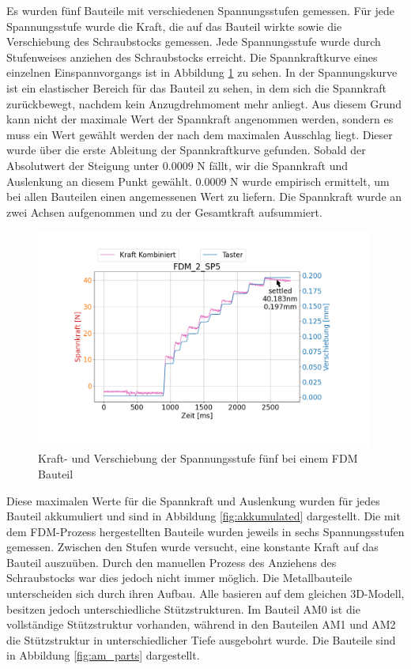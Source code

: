 Es wurden fünf Bauteile mit verschiedenen Spannungsstufen gemessen. Für jede 
Spannungsstufe wurde die Kraft, die auf das Bauteil wirkte sowie die Verschiebung 
des Schraubstocks gemessen.
Jede Spannungsstufe wurde durch Stufenweises anziehen des Schraubstocks erreicht.
Die Spannkraftkurve eines einzelnen Einspannvorgangs ist in 
Abbildung \ref{fig:single} zu sehen. 
In der Spannungskurve ist ein elastischer Bereich für das 
Bauteil zu sehen, in dem sich die Spannkraft zurückbewegt, nachdem kein 
Anzugdrehmoment mehr anliegt. Aus diesem Grund kann nicht der maximale Wert der Spannkraft angenommen werden, 
sondern es muss ein Wert gewählt werden der nach dem maximalen Ausschlag liegt.
Dieser wurde über die erste Ableitung der Spannkraftkurve gefunden. Sobald der 
Absolutwert der Steigung unter 0.0009 N fällt, wir die Spannkraft und Auslenkung an 
diesem Punkt gewählt. 0.0009 N wurde empirisch ermittelt, um bei allen Bauteilen einen 
angemessenen Wert zu liefern.
Die Spannkraft wurde an zwei Achsen aufgenommen und zu der Gesamtkraft aufsummiert.

\begin{figure}[H]
    \centering
    \includegraphics[width=0.99\textwidth]{images/spannkraftstufen_single.png}
    \caption{Kraft- und Verschiebung der Spannungsstufe fünf bei einem FDM Bauteil}
    \label{fig:single}
\end{figure}

Diese maximalen Werte für die Spannkraft und Auslenkung wurden für jedes Bauteil 
akkumuliert und sind in Abbildung \ref{fig:akkumulated} dargestellt. 
Die mit dem FDM-Prozess hergestellten Bauteile wurden jeweils in sechs Spannungsstufen
gemessen. Zwischen den Stufen wurde versucht, eine konstante Kraft auf das Bauteil 
auszuüben. Durch den manuellen Prozess des Anziehens des Schraubstocks war dies 
jedoch nicht immer möglich.
Die Metallbauteile unterscheiden sich durch ihren Aufbau. 
Alle basieren auf dem gleichen 3D-Modell, besitzen jedoch unterschiedliche 
Stützstrukturen. Im Bauteil AM0 ist die vollständige Stützstruktur vorhanden,
während in den Bauteilen AM1 und AM2 die Stützstruktur in unterschiedlicher 
Tiefe ausgebohrt wurde. Die Bauteile sind in Abbildung \ref{fig:am_parts} dargestellt.

